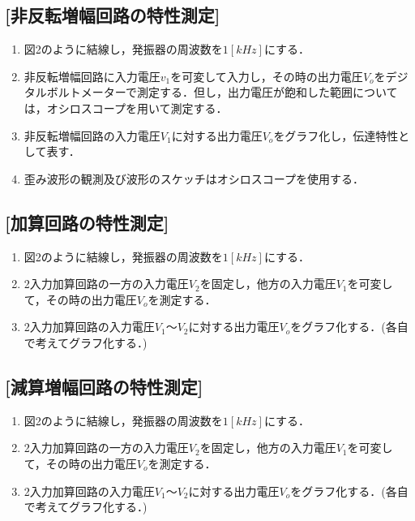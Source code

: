 \documentclass[10pt, a4j, dvipdfmx]{jarticle}
\begin{document}
\subsection{[非反転増幅回路の特性測定]}
\begin{enumerate}
    \item 図2のように結線し，発振器の周波数を$1[kHz]$にする．
    \item 非反転増幅回路に入力電圧$v_1$を可変して入力し，その時の出力電圧$V_o$をデジタルボルトメーターで測定する．但し，出力電圧が飽和した範囲については，オシロスコープを用いて測定する．
    \item 非反転増幅回路の入力電圧$V_1$に対する出力電圧$V_o$をグラフ化し，伝達特性として表す．
    \item 歪み波形の観測及び波形のスケッチはオシロスコープを使用する．
\end{enumerate}
\subsection{[加算回路の特性測定]}
\begin{enumerate}
    \item 図2のように結線し，発振器の周波数を$1[kHz]$にする．
    \item 2入力加算回路の一方の入力電圧$V_2$を固定し，他方の入力電圧$V_1$を可変して，その時の出力電圧$V_o$を測定する．
    \item 2入力加算回路の入力電圧$V_1$～$V_2$に対する出力電圧$V_o$をグラフ化する．(各自で考えてグラフ化する．)
\end{enumerate}
\subsection{[減算増幅回路の特性測定]}
\begin{enumerate}
    \item 図2のように結線し，発振器の周波数を$1[kHz]$にする．
    \item 2入力加算回路の一方の入力電圧$V_2$を固定し，他方の入力電圧$V_1$を可変して，その時の出力電圧$V_o$を測定する．
    \item 2入力加算回路の入力電圧$V_1$～$V_2$に対する出力電圧$V_o$をグラフ化する．(各自で考えてグラフ化する．)
\end{enumerate}
\end{document}
